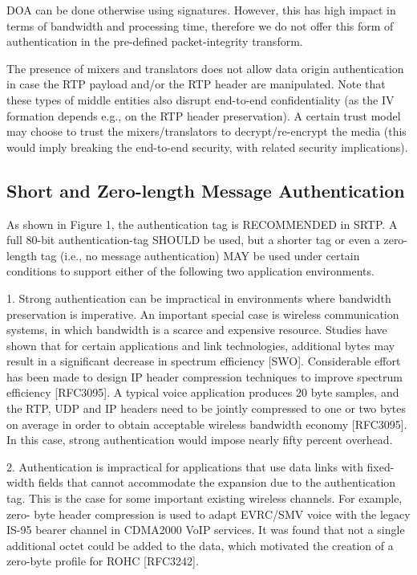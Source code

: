 \documentclass{article}
\begin{document}
DOA can be done otherwise using signatures.  However, this has high impact in terms of bandwidth and processing time, therefore we do not offer this form of authentication in the pre-defined packet-integrity transform.

The presence of mixers and translators does not allow data origin authentication in case the RTP payload and/or the RTP header are manipulated.  Note that these types of middle entities also disrupt end-to-end confidentiality (as the IV formation depends e.g., on the RTP header preservation).  A certain trust model may choose to trust the mixers/translators to decrypt/re-encrypt the media (this would imply breaking the end-to-end security, with related security implications).

\subsection{Short and Zero-length Message Authentication}

As shown in Figure 1, the authentication tag is RECOMMENDED in SRTP. A full 80-bit authentication-tag SHOULD be used, but a shorter tag or even a zero-length tag (i.e., no message authentication) MAY be used under certain conditions to support either of the following two application environments.

1. Strong authentication can be impractical in environments where bandwidth preservation is imperative.  An important special case is wireless communication systems, in which bandwidth is a scarce and expensive resource.  Studies have shown that for certain applications and link technologies, additional bytes may result in a significant decrease in spectrum efficiency [SWO].  Considerable effort has been made to design IP header compression techniques to improve spectrum efficiency [RFC3095].  A typical voice application produces 20 byte samples, and the RTP, UDP and IP headers need to be jointly compressed to one or two bytes on average in order to obtain acceptable wireless bandwidth economy [RFC3095].  In this case, strong authentication would impose nearly fifty percent overhead.

2. Authentication is impractical for applications that use data links with fixed-width fields that cannot accommodate the expansion due to the authentication tag.  This is the case for some important existing wireless channels.  For example, zero- byte header compression is used to adapt EVRC/SMV voice with the legacy IS-95 bearer channel in CDMA2000 VoIP services.  It was found that not a single additional octet could be added to the data, which motivated the creation of a zero-byte profile for ROHC [RFC3242].
\end{document}
